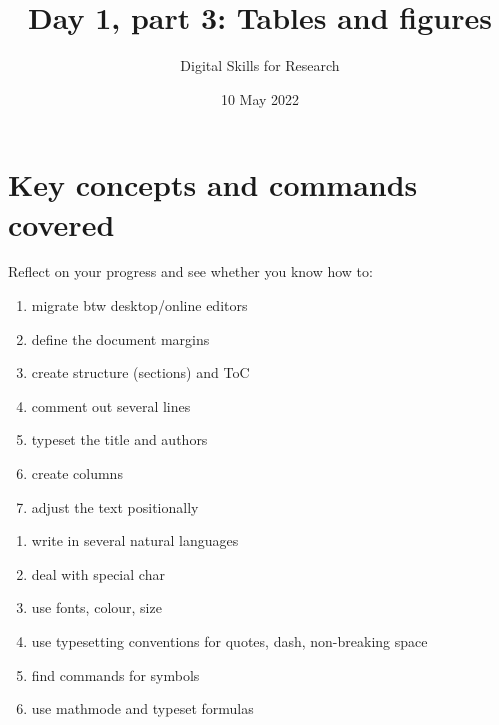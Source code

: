 \documentclass[a4paper,11pt]{article}
\title{Day 1, part 3: Tables and figures}
\author{Digital Skills for Research}
\date{10 May 2022}
\begin{document}

\clearpage
\maketitle
\thispagestyle{empty}

\tableofcontents

\section*{Key concepts and commands covered}

Reflect on your progress and see whether you know how to:

\bigskip

\begin{tcolorbox}[width=.475\textwidth, nobeforeafter,height=6.5cm,valign=center, fonttitle=\bfseries,title=Editors and start]
		\begin{enumerate}
		\item migrate btw desktop/online editors
		\item define the document margins
		\item create structure (sections) and ToC
		\item comment out several lines
		\item typeset the title and authors
		\item create columns
		\item adjust the text positionally 
	\end{enumerate}
\end{tcolorbox}\hfill
%
\begin{tcolorbox}[width=.475\textwidth, nobeforeafter,height=6.5cm,valign=center,fonttitle=\bfseries,title=Text formatting and formulas]
	\begin{enumerate}
		\item write in several natural languages
		\item deal with special char
		\item use fonts, colour, size
		\item use typesetting conventions for quotes, dash, non-breaking space
		\item find commands for symbols
		\item use mathmode and typeset formulas
	\end{enumerate}
\end{tcolorbox}
\end{document}
